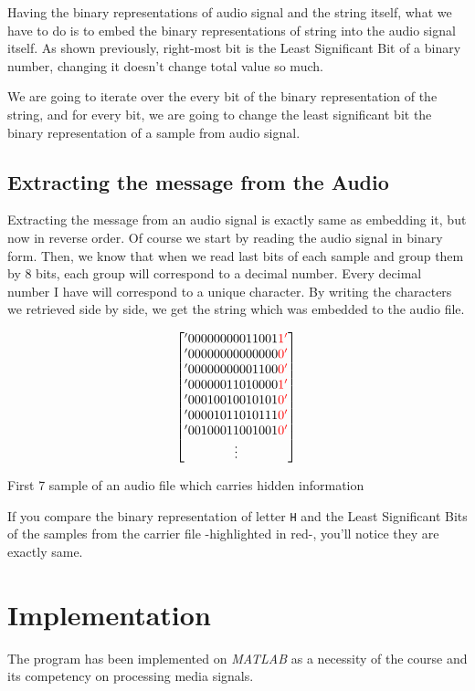 \documentclass[twocolumns]{IEEEtran}
\begin{document}
	Having the binary representations of audio signal and the string itself, what we have to do is to embed the binary representations of string into the audio signal itself. As shown previously, right-most bit is the Least Significant Bit of a binary number, changing it doesn't change total value so much.
	
	We are going to iterate over the every bit of the binary representation of the string, and for every bit, we are going to change the least significant bit the binary representation of a sample from audio signal.
	
	\subsection{Extracting the message from the Audio}
	
	Extracting the message from an audio signal is exactly same as embedding it, but now in reverse order. Of course we start by reading the audio signal in binary form. Then, we know that when we read last bits of each sample and group them by 8 bits, each group will correspond to a decimal number. Every decimal number I have will correspond to a unique character. By writing the characters we retrieved side by side, we get the string which was embedded to the audio file.
	
	\begin{equation}
			\begin{bmatrix}
				'00000000011001\color{red}1' \\
				'00000000000000\color{red}0' \\
				'00000000001100\color{red}0' \\
				'00000011010000\color{red}1' \\
				'00010010010101\color{red}0' \\
				'00001011010111\color{red}0' \\
				'00100011001001\color{red}0' \\
			\vdots
			\end{bmatrix} \\ \\		
		\end{equation}
	\begin{center}
		First 7 sample of an audio file which carries hidden information
	\end{center}
	If you compare the binary representation of letter \texttt{H} and the Least Significant Bits of the samples from the carrier file -highlighted in red-, you'll notice they are exactly same.
	
	\section{Implementation}
	The program has been implemented on \textit{MATLAB} as a necessity of the course and its competency on processing media signals.
	
	
	
\end{document}

